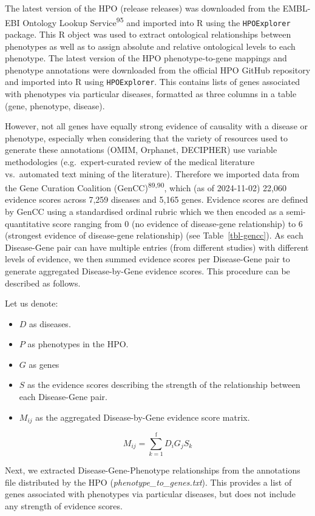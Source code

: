 \documentclass[
]{article}
\begin{document}
The latest version of the HPO (release releases) was downloaded from the
EMBL-EBI Ontology Lookup Service\textsuperscript{95} and imported into R
using the \texttt{HPOExplorer} package. This R object was used to
extract ontological relationships between phenotypes as well as to
assign absolute and relative ontological levels to each phenotype. The
latest version of the HPO phenotype-to-gene mappings and phenotype
annotations were downloaded from the official HPO GitHub repository and
imported into R using \texttt{HPOExplorer}. This contains lists of genes
associated with phenotypes via particular diseases, formatted as three
columns in a table (gene, phenotype, disease).

However, not all genes have equally strong evidence of causality with a
disease or phenotype, especially when considering that the variety of
resources used to generate these annotations (OMIM, Orphanet, DECIPHER)
use variable methodologies (e.g.~expert-curated review of the medical
literature vs.~automated text mining of the literature). Therefore we
imported data from the Gene Curation Coalition
(GenCC)\textsuperscript{89,90}, which (as of 2024-11-02) 22,060 evidence
scores across 7,259 diseases and 5,165 genes. Evidence scores are
defined by GenCC using a standardised ordinal rubric which we then
encoded as a semi-quantitative score ranging from 0 (no evidence of
disease-gene relationship) to 6 (strongest evidence of disease-gene
relationship) (see Table~\ref{tbl-gencc}). As each Disease-Gene pair can
have multiple entries (from different studies) with different levels of
evidence, we then summed evidence scores per Disease-Gene pair to
generate aggregated Disease-by-Gene evidence scores. This procedure can
be described as follows.

Let us denote:

\begin{itemize}
\item
  \(D\) as diseases.
\item
  \(P\) as phenotypes in the HPO.
\item
  \(G\) as genes
\item
  \(S\) as the evidence scores describing the strength of the
  relationship between each Disease-Gene pair.
\item
  \(M_{ij}\) as the aggregated Disease-by-Gene evidence score matrix.
\end{itemize}

\[
M_{ij} = \sum_{k=1}^{\text{f}} D_i G_j S_k
\]

Next, we extracted Disease-Gene-Phenotype relationships from the
annotations file distributed by the HPO
(\emph{phenotype\_to\_genes.txt}). This provides a list of genes
associated with phenotypes via particular diseases, but does not include
any strength of evidence scores.
\end{document}

